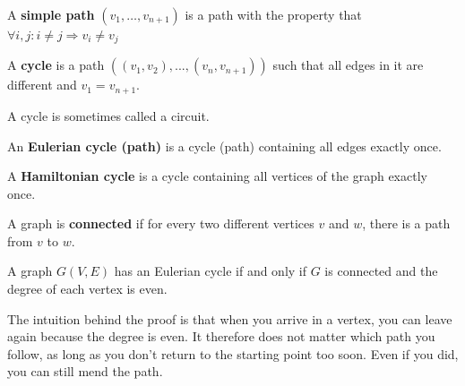 \begin{definition}
  \textup{A \textbf{simple path} $(v_{1}, \ldots , v_{n+1})$ is a path
  with the property that $\forall i,j: i \neq j \Rightarrow v_{i} \neq v_{j}$ }
\end{definition}



\begin{definition}[Cycle]
  \textup{A \textbf{cycle} is a path
    $((v_1,v_2),...,(v_n,v_{n+1}))$ such that all edges in it are
different and $v_{1} = v_{n+1}$.}
\end{definition}

A cycle is sometimes called a circuit.


\begin{definition}
  \textup{An \textbf{Eulerian cycle (path)} is a cycle (path)
containing all edges exactly once.}
\end{definition}

\begin{definition}
  \textup{ A \textbf{Hamiltonian cycle} is a cycle containing all
vertices of the graph exactly once.}
\end{definition}


\begin{definition}
  \textup{ A graph is \textbf{connected} if for every two different
vertices $v$ and $w$, there is a path from $v$ to $w$.}
\end{definition}



\begin{theorem}
  A graph $G(V,E)$ has an Eulerian cycle if and only if $G$ is
  connected and the degree of each vertex is even.
\end{theorem}
The intuition behind the proof is that when you arrive in a vertex,
you can leave again because the degree is even. It therefore does not
matter which path you follow, as long as you don't return to the
starting point too soon. Even if you did, you can still mend the path.


